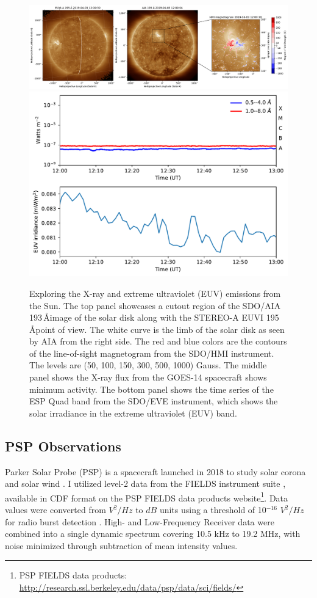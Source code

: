 \begin{figure}[!htp]
\centering
\includegraphics[width=\hsize]{chapter3/figs/aia_sta_cutout.pdf}
\includegraphics[width=12cm]{chapter3/figs/xrs_eve.pdf}
\caption{Exploring the X-ray and extreme ultraviolet (EUV) emissions from the Sun. The top panel showcases a cutout region of the SDO/AIA 193\,\AA image of the solar disk along with the STEREO-A EUVI 195\,\AA point of view. The white curve is the limb of the solar disk as seen by AIA from the right side. The red and blue colors are the contours of the line-of-sight magnetogram from the SDO/HMI instrument. The levels are (50, 100, 150, 300, 500, 1000) Gauss. The middle panel shows the X-ray flux from the GOES-14 spacecraft shows minimum activity. The bottom panel shows the time series of the ESP Quad band from the SDO/EVE instrument, which shows the solar irradiance in the extreme ultraviolet (EUV) band.}
\label{soldisk_xrs}
\end{figure}

\subsection{PSP Observations}
Parker Solar Probe (PSP) is a spacecraft launched in 2018 to study solar corona and solar wind \citep{fox_2016}. I utilized level-2 data from the FIELDS instrument suite \citep{bale_2016, pulupa_2017}, available in CDF format on the PSP FIELDS data products website\footnote{PSP FIELDS data products: \url{http://research.ssl.berkeley.edu/data/psp/data/sci/fields/}}. Data values were converted from $V^2/Hz$ to $dB$ units using a threshold of 10$^{-16}$ $V^2/Hz$ for radio burst detection \citep{pulupa_2020}. High- and Low-Frequency Receiver data were combined into a single dynamic spectrum covering 10.5 kHz to 19.2 MHz, with noise minimized through subtraction of mean intensity values.

